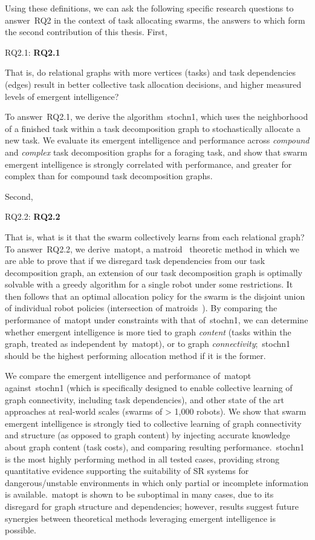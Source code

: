 Using these definitions, we can ask the following specific research questions to
answer~\gls{RQ2} in the context of task allocating swarms, the answers to which
form the second contribution of this thesis. First,

\medskip\noindent
\gls{RQ2.1}: \textbf{\Glsdesc{RQ2.1}}
\medskip

\noindent
That is, do relational graphs with more vertices (tasks) and task dependencies
(edges) result in better collective task allocation decisions, and higher
measured levels of emergent intelligence?

To answer~\gls{RQ2.1}, we derive the algorithm~\gls{stochn1}, which uses the
neighborhood of a finished task within a task decomposition graph to
stochastically allocate a new task. We evaluate its emergent intelligence and
performance across \emph{compound} and \emph{complex} task decomposition graphs
for a foraging task, and show that swarm emergent intelligence is strongly
correlated with performance, and greater for complex than for compound task
decomposition graphs.

Second,

\medskip\noindent
\gls{RQ2.2}: \textbf{\Glsdesc{RQ2.2}}
\medskip

\noindent
That is, what is it that the swarm collectively learns from each relational
graph?  To answer~\gls{RQ2.2}, we derive~\gls{matopt}, a
matroid~\cite{Tutte1959,Whitney1935,Oxley2006} theoretic method in which we are
able to prove that if we disregard task dependencies from our task decomposition
graph, an extension of our task decomposition graph is optimally solvable with a
greedy algorithm for a single robot under some restrictions. It then follows
that an optimal allocation policy for the swarm is the disjoint union of
individual robot policies (intersection of matroids~\cite{Williams2017}). By
comparing the performance of~\gls{matopt} under constraints with that
of~\gls{stochn1}, we can determine whether emergent intelligence is more tied
to graph \emph{content} (tasks within the graph, treated as independent
by~\gls{matopt}), or to graph \emph{connectivity};~\gls{stochn1} should be the
highest performing allocation method if it is the former.

We compare the emergent intelligence and performance of~\gls{matopt}
against~\gls{stochn1} (which is specifically designed to enable collective
learning of graph connectivity, including task dependencies), and other state of
the art approaches at real-world scales (swarms of > 1,000 robots). We show that
swarm emergent intelligence is strongly tied to collective learning of graph
connectivity and structure (as opposed to graph content) by injecting accurate
knowledge about graph content (task costs), and comparing resulting
performance.~\gls{stochn1} is the most highly performing method in all tested
cases, providing strong quantitative evidence supporting the suitability of SR
systems for dangerous/unstable environments in which only partial or incomplete
information is available.~\gls{matopt} is shown to be suboptimal in many cases,
due to its disregard for graph structure and dependencies; however, results
suggest future synergies between theoretical methods leveraging emergent
intelligence is possible.

